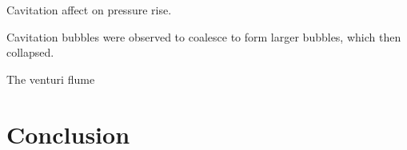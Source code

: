 \documentclass{article}
\begin{document}

Cavitation affect on pressure rise.




Cavitation bubbles were observed to coalesce to form larger bubbles, which then collapsed.



The venturi flume 

\section{Conclusion}
\end{document}

